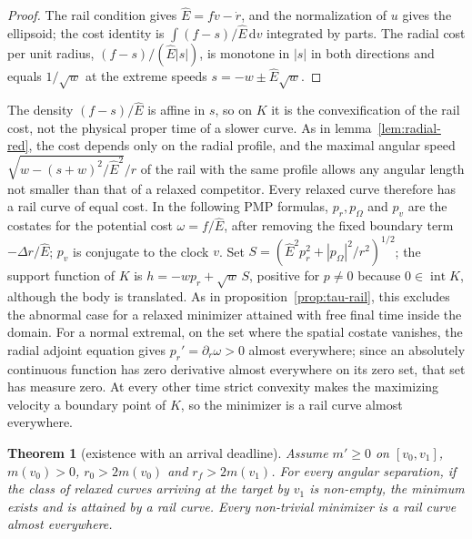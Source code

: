 \documentclass[aip,jmp,amsmath,amssymb,reprint]{revtex4-2}
\newcommand{\Ehat}{\hat E}
\newcommand{\dd}{\mathrm{d}}
\theoremstyle{plain}
\newtheorem{theorem}{Theorem}
\theoremstyle{definition}
\begin{document}
\begin{proof}
The rail condition gives $\Ehat=f\dot v-\dot r$, and the normalization of $u$ gives the
ellipsoid; the cost identity is $\int(f-s)/\Ehat\,\dd v$ integrated by parts. The radial cost
per unit radius, $(f-s)/(\Ehat|s|)$, is monotone in $|s|$ in both directions and equals
$1/\sqrt w$ at the extreme speeds $s=-w\pm\Ehat\sqrt w$.
\end{proof}

The density $(f-s)/\Ehat$ is affine in $s$, so on $K$ it is the convexification of the rail
cost, not the physical proper time of a slower curve. As in lemma~\ref{lem:radial-red}, the
cost depends only on the radial profile, and the maximal angular speed
$\sqrt{w-(s+w)^2/\Ehat^2}/r$ of the rail with the same profile allows any angular length
not smaller than that of a relaxed competitor. Every relaxed curve therefore has a rail
curve of equal cost. In the following PMP formulas, $p_r,p_\Omega$ and $p_v$ are the costates for
the potential cost $\omega=f/\Ehat$, after removing the fixed boundary term $-\Delta r/\Ehat$; $p_v$ is
conjugate to the clock $v$. Set $S=(\Ehat^2p_r^2+|p_\Omega|^2/r^2)^{1/2}$; the support function of $K$
is $h=-wp_r+\sqrt w\,S$, positive for $p\neq0$ because $0\in\operatorname{int}K$, although the body is
translated. As in proposition~\ref{prop:tau-rail}, this excludes the abnormal case for a
relaxed minimizer attained with free final time inside the domain. For a normal extremal,
on the set where the spatial costate vanishes, the radial adjoint equation gives
$p_r'=\partial_r\omega>0$ almost everywhere; since an absolutely continuous function has zero
derivative almost everywhere on its zero set, that set has measure zero. At every other time
strict convexity makes the maximizing velocity a boundary point of $K$, so the minimizer is a
rail curve almost everywhere.

\begin{theorem}[existence with an arrival deadline]\label{thm:vaidya-exist}
Assume $m'\ge0$ on $[v_0,v_1]$, $m(v_0)>0$, $r_0>2m(v_0)$ and $r_f>2m(v_1)$. For every
angular separation, if the class of relaxed curves arriving at the target by $v_1$ is
non-empty, the minimum exists and is attained by a rail curve. Every non-trivial minimizer
is a rail curve almost everywhere.
\end{theorem}
\end{document}

